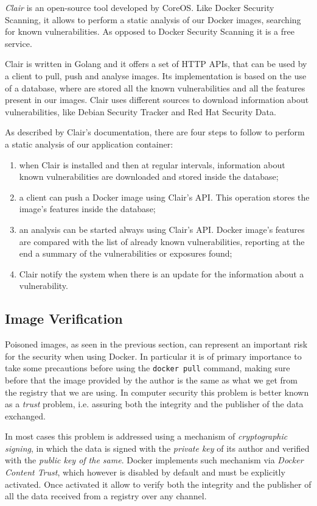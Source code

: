 \documentclass[a4paper,12pt]{article}
\newcommand{\code}[1]{\lstinline|#1|}
\def\ie{i.e.\xspace}
\begin{document}
\textit{Clair} \cite{clair} is an open-source tool developed by CoreOS. Like
Docker Security Scanning, it allows to perform a static analysis of our Docker
images, searching for known vulnerabilities. As opposed to Docker Security
Scanning it is a free service. \par Clair is written in Golang and it offers a
set of HTTP APIs, that can be used by a client to pull, push and analyse images.
Its implementation is based on the use of a database, where are stored all the
known vulnerabilities and all the features present in our images. Clair uses
different sources to download information about vulnerabilities, like Debian
Security Tracker and Red Hat Security Data. \par As described by Clair's
documentation, there are four steps to follow to perform a static analysis of
our application container:
\begin{enumerate}
  \item when Clair is installed and then at regular intervals, information about
  known vulnerabilities are downloaded and stored inside the database;
  \item a client can push a Docker image using Clair's API. This operation
  stores the image's features inside the database;
  \item an analysis can be started always using Clair's API. Docker image's
  features are compared with the list of already known vulnerabilities,
  reporting at the end a summary of the vulnerabilities or exposures found;
  \item Clair notify the system when there is an update for the information
  about a vulnerability.
\end{enumerate}

\subsection{Image Verification}

Poisoned images, as seen in the previous section, can represent an important
risk for the security when using Docker. In particular it is of primary
importance to take some precautions before using the \code{docker pull}
command, making sure before that the image provided by the author is the same as
what we get from the registry that we are using. In computer security this
problem is better known as a \textit{trust} problem, \ie assuring both the
integrity and the publisher of the data exchanged. \par In most cases this problem
is addressed using a mechanism of \textit{cryptographic signing}, in which the
data is signed with the \textit{private key} of its author and verified with the
\textit{public key of the same}. Docker implements such mechanism via
\textit{Docker Content Trust}, which however is disabled by default and must be
explicitly activated. Once activated it allow to verify both the integrity and
the publisher of all the data received from a registry over any channel.
\end{document}
